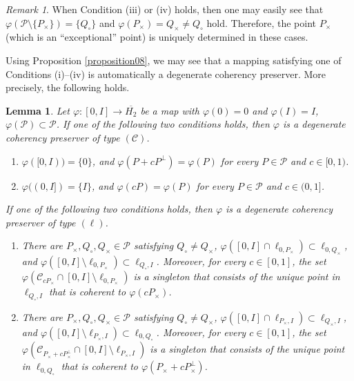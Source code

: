 \documentclass[10pt]{amsart}
\newtheorem{lemma}[theorem]{Lemma}
\theoremstyle{definition}
\theoremstyle{remark}
\newtheorem{remark}[theorem]{Remark}
\numberwithin{subsection}{section}
\numberwithin{equation}{section}
\newcommand\cP{{\mathcal{P}}}
\newcommand\oH{{\overline{H_2}}}
\begin{document}
\begin{remark}\label{iiiiv}
When Condition (iii) or (iv) holds, then one may easily see that $\varphi(\mathcal{P}\setminus \{P_\times\})=\{Q_\circ\}$ and $\varphi(P_\times)=Q_\times\neq Q_\circ$ hold.
Therefore, the point $P_\times$ (which is an ``exceptional'' point) is uniquely determined in these cases. 
\end{remark}

Using Proposition \ref{proposition08}, we may see that a mapping satisfying one of Conditions (i)--(iv) is automatically a degenerate coherency preserver. 
More precisely, the following holds.
\begin{lemma}\label{conv}
Let $\varphi\colon [0, I]\to \oH$ be a map with $\varphi(0)=0$ and $\varphi(I)=I$, $\varphi(\cP)\subset \cP$. 
If one of the following two conditions holds, then $\varphi$ is a degenerate coherency preserver of type $(\mathcal{C})$.
\begin{enumerate}
\item[(i)'] $\varphi([0, I))=\{0\}$, and $\varphi(P+cP^\perp)=\varphi(P)$ for every $P\in \mathcal{P}$ and $c\in [0, 1)$.
\item[(ii)'] $\varphi((0, I])=\{I\}$, and $\varphi(cP)=\varphi(P)$ for every $P\in \mathcal{P}$ and $c\in (0, 1]$.
\end{enumerate}
If one of the following two conditions holds, then $\varphi$ is a degenerate coherency preserver of type $(\ell)$.
\begin{enumerate}
\item[(iii)'] There are $P_\times, Q_\circ, Q_\times\in \mathcal{P}$ satisfying $Q_\circ\neq Q_\times$, $\varphi([0,I] \cap \ell_{0, P_\times})\subset \ell_{0,Q_\times}$, and $\varphi([0,I] \setminus \ell_{0, P_\times})\subset \ell_{Q_\circ,I}$. Moreover, for every $c\in [0,1]$, the set $\varphi(\mathcal{C}_{cP_\times}\cap [0, I]\setminus \ell_{0, P_\times})$ is a singleton that consists of the unique point in $\ell_{Q_\circ, I}$ that is coherent to $\varphi(cP_\times)$.
\item[(iv)'] There are $P_\times, Q_\circ, Q_\times\in \mathcal{P}$ satisfying $Q_\circ\neq Q_\times$, $\varphi([0,I] \cap \ell_{P_\times,I})\subset \ell_{Q_\times, I}$, and $\varphi([0,I] \setminus \ell_{P_\times, I})\subset \ell_{0,Q_\circ}$. Moreover, for every $c\in [0, 1]$, the set $\varphi(\mathcal{C}_{P_\times+cP_\times^\perp}\cap [0, I]\setminus \ell_{P_\times, I})$ is a singleton that consists of the unique point in $\ell_{0,Q_\circ}$ that is coherent to $\varphi(P_\times+cP_\times^\perp)$.
\end{enumerate} 
\end{lemma}
\end{document}
